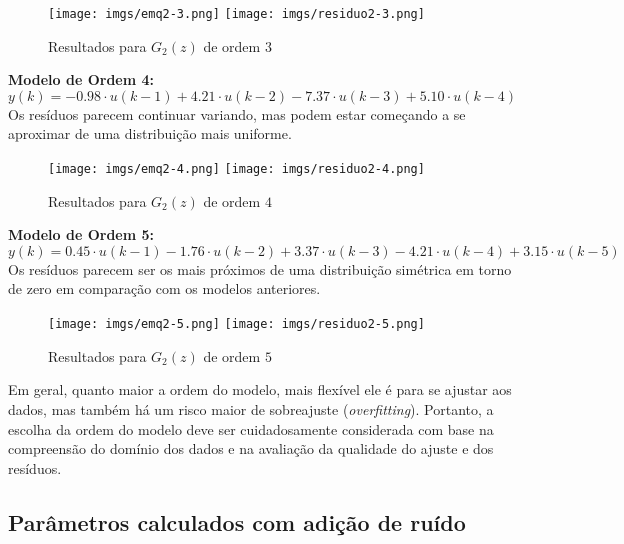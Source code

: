 \documentclass[a4paper,12pt]{article}
\begin{document}
\begin{figure}[h!]
\begin{center}
	\texttt{[image: imgs/emq2-3.png]} \quad
	\texttt{[image: imgs/residuo2-3.png]}
\caption{Resultados para $G_2(z)$ de ordem $3$} \label{fig13}
\end{center}
\end{figure}
\newpage
\noindent \textbf{Modelo de Ordem 4:}
\begin{equation*}
   y(k) = -0.98 \cdot u(k-1) + 4.21 \cdot u(k-2) - 7.37 \cdot u(k-3) + 5.10 \cdot u(k-4)\tag{4.4.2.4}
\end{equation*}
Os resíduos parecem continuar variando, mas podem estar começando a se aproximar de uma distribuição mais uniforme.

\begin{figure}[h!]
\begin{center}
	\texttt{[image: imgs/emq2-4.png]} \quad
	\texttt{[image: imgs/residuo2-4.png]}
\caption{Resultados para $G_2(z)$ de ordem $4$} \label{fig14}
\end{center}
\end{figure}

\newpage
\noindent \textbf{Modelo de Ordem 5:}
\begin{equation*}
   y(k) = 0.45 \cdot u(k-1) - 1.76 \cdot u(k-2) + 3.37 \cdot u(k-3) - 4.21 \cdot u(k-4) + 3.15 \cdot u(k-5)\tag{4.4.2.5}
\end{equation*}
Os resíduos parecem ser os mais próximos de uma distribuição simétrica em torno de zero em comparação com os modelos anteriores.

\begin{figure}[h!]
\begin{center}
	\texttt{[image: imgs/emq2-5.png]} \quad
	\texttt{[image: imgs/residuo2-5.png]}
\caption{Resultados para $G_2(z)$ de ordem $5$} \label{fig15}
\end{center}
\end{figure}

Em geral, quanto maior a ordem do modelo, mais flexível ele é para se ajustar aos dados, mas também há um risco maior de sobreajuste (\textit{overfitting}). Portanto, a escolha da ordem do modelo deve ser cuidadosamente considerada com base na compreensão do domínio dos dados e na avaliação da qualidade do ajuste e dos resíduos.

\subsection{Parâmetros calculados com adição de ruído}
\end{document}
